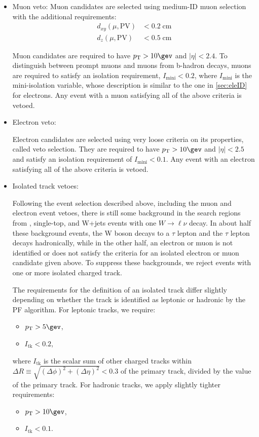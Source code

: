 \begin{itemize}
\item Muon veto:
  Muon candidates are selected using
  medium-ID muon selection \cite{Sirunyan:2018fpa} with the additional
  requirements:
  \begin{align}
    d_{xy}(\mu,\mathrm{PV}) &< 0.2\;\mathrm{cm}\nonumber\\
    d_{z}(\mu,\mathrm{PV}) &< 0.5\;\mathrm{cm}
  \end{align}

  Muon candidates are required to have $\pt>10\gev$ and $|\eta|<2.4$.
  To distinguish between prompt muons and muons from b-hadron
  decays, muons are required to satisfy an isolation requirement,
  $I_{\mathrm{mini}}<0.2$, where $I_{\mathrm{mini}}$ is the mini-isolation
  variable, whose description is similar to the one in \ref{sec:eleID} for electrons.
 Any event with a muon satisfying all of the  above criteria is vetoed.

\item Electron veto:

  Electron candidates are selected using very loose criteria on its properties, called veto selection.
  They are required to have $\pt>10\gev$ and $|\eta|<2.5$ and satisfy an isolation
  requirement of $I_{\mathrm{mini}}<0.1$. Any event with an electron satisfying all of the
  above criteria is vetoed.
\item Isolated track vetoes:
  
  Following the event selection described above,
  including the muon and electron event vetoes,
  there is still some background in the search regions from
  \ttbar, single-top, and W+jets events with one $W\rightarrow\ell\nu$
  decay.  In about half these background events, the W boson decays to a $\tau$ lepton
  and the $\tau$ lepton decays hadronically,
  while in the other half, an electron or muon is not identified
  or does not satisfy the criteria for an isolated electron or muon
  candidate given above.
  To suppress these backgrounds,
  we reject events with one or more isolated
  charged track.

  The requirements for the definition of an isolated track
  differ slightly depending on whether the track is identified
  as leptonic or hadronic by the PF algorithm.
  For leptonic tracks, we require:
  \begin{itemize}
  \item $\pt>5\gev$,
  \item $I_{\mathrm{tk}}<0.2$,
  \end{itemize}
  where $I_{\mathrm{tk}}$ is the scalar \pt sum of other
  charged tracks within $\Delta R\equiv\sqrt{(\Delta\phi)^2+(\Delta\eta)^2}<0.3$ of the primary track, divided
  by the \pt value of the primary track.
  For hadronic tracks, we apply slightly tighter requirements:
  \begin{itemize}
  \item $\pt>10\gev$,
  \item $I_{\mathrm{tk}}<0.1$.
  \end{itemize}


\end{itemize}
